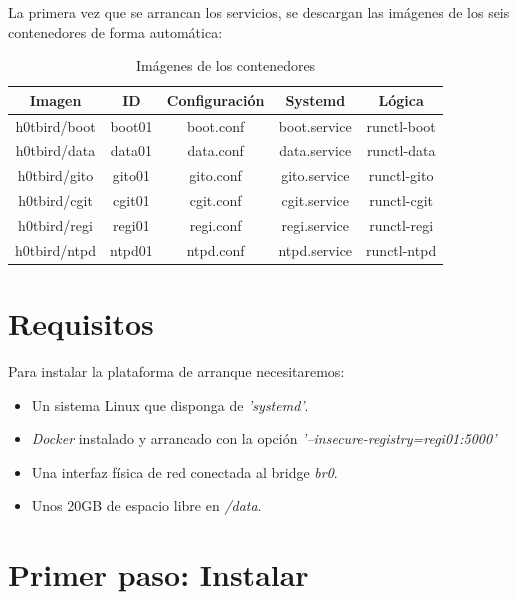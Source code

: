 \documentclass[a4paper,12pt,spanish,final]{epsc_tfc_pfc}
\begin{document}
La primera vez que se arrancan los servicios, se descargan las imágenes de los seis contenedores de forma automática:\\

\begin{table}[h]
\centering
\begin{tabular}{|c|c|c|c|c|}
\hline
\rowcolor[HTML]{C0C0C0}
\textbf{Imagen} & \textbf{ID} & \textbf{Configuración} & \textbf{Systemd} & \textbf{Lógica} \\ \hline
h0tbird/boot    & boot01      & boot.conf              & boot.service     & runctl-boot     \\ \hline
h0tbird/data    & data01      & data.conf              & data.service     & runctl-data     \\ \hline
h0tbird/gito    & gito01      & gito.conf              & gito.service     & runctl-gito     \\ \hline
h0tbird/cgit    & cgit01      & cgit.conf              & cgit.service     & runctl-cgit     \\ \hline
h0tbird/regi    & regi01      & regi.conf              & regi.service     & runctl-regi     \\ \hline
h0tbird/ntpd    & ntpd01      & ntpd.conf              & ntpd.service     & runctl-ntpd     \\ \hline
\end{tabular}
\caption{Imágenes de los contenedores}
\end{table}

\clearpage

\section{Requisitos}

Para instalar la plataforma de arranque necesitaremos:

\begin{itemize}
  \item Un sistema Linux que disponga de \emph{'systemd'}.
  \item \emph{Docker} instalado y arrancado con la opción \emph{'--insecure-registry=regi01:5000'}
  \item Una interfaz física de red conectada al bridge \emph{br0}.
  \item Unos 20GB de espacio libre en \emph{/data}.
\end{itemize}

\section{Primer paso: Instalar}
\end{document}
